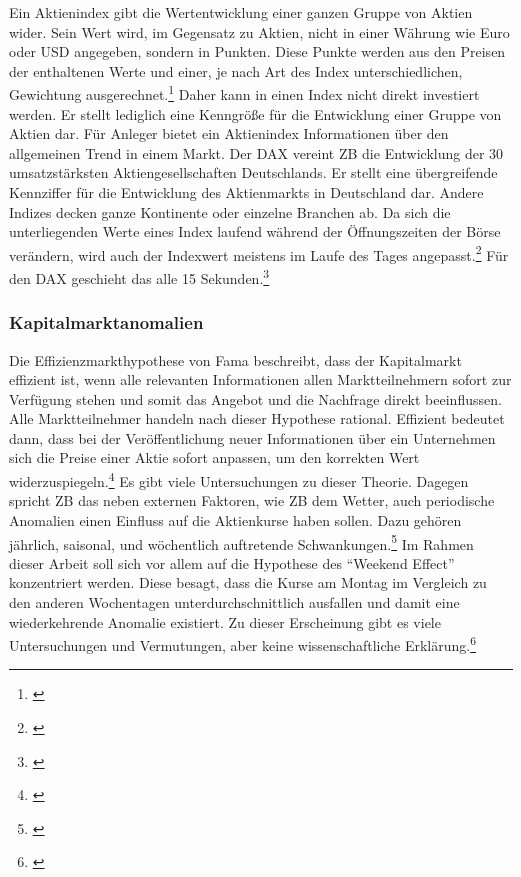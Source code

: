 Ein Aktienindex gibt die Wertentwicklung einer ganzen Gruppe von Aktien wider. Sein Wert wird, im Gegensatz zu Aktien, nicht in einer Währung wie Euro oder \gls{USD} angegeben, sondern in Punkten. Diese Punkte werden aus den Preisen der enthaltenen Werte und einer, je nach Art des Index unterschiedlichen, Gewichtung ausgerechnet.\footnote{\cite[Vgl.][61]{Daume2021}} Daher kann in einen Index nicht direkt investiert werden. Er stellt lediglich eine Kenngröße für die Entwicklung einer Gruppe von Aktien dar. Für Anleger bietet ein Aktienindex Informationen über den allgemeinen Trend in einem Markt. Der \gls{DAX} vereint \gls{ZB} die Entwicklung der 30 umsatzstärksten Aktiengesellschaften Deutschlands. Er stellt eine übergreifende Kennziffer für die Entwicklung des Aktienmarkts in Deutschland dar. Andere Indizes decken ganze Kontinente oder einzelne Branchen ab. Da sich die unterliegenden Werte eines Index laufend während der Öffnungszeiten der Börse verändern, wird auch der Indexwert meistens im Laufe des Tages angepasst.\footnote{\cite[Vgl.][110]{Grundmann2021}} Für den \gls{DAX} geschieht das alle 15 Sekunden.\footnote{\cite[Vgl.][63]{Daume2021}}

\subsubsection{Kapitalmarktanomalien}



Die Effizienzmarkthypothese von Fama beschreibt, dass der Kapitalmarkt effizient ist, wenn alle relevanten Informationen allen Marktteilnehmern sofort zur Verfügung stehen und somit das Angebot und die Nachfrage direkt beeinflussen. Alle Marktteilnehmer handeln nach dieser Hypothese rational. Effizient bedeutet dann, dass bei der Veröffentlichung neuer Informationen über ein Unternehmen sich die Preise einer Aktie sofort anpassen, um den korrekten Wert widerzuspiegeln.\footnote{\cite[Vgl.][9\psq]{Wagner2019}} Es gibt viele Untersuchungen zu dieser Theorie. Dagegen spricht \gls{ZB} das neben externen Faktoren, wie \gls{ZB} dem Wetter, auch periodische Anomalien einen Einfluss auf die Aktienkurse haben sollen. Dazu gehören jährlich, saisonal, und wöchentlich auftretende Schwankungen.\footnote{\cite[Vgl.][5\psq]{Coenen2020}} Im Rahmen dieser Arbeit soll sich vor allem auf die Hypothese des \enquote{Weekend Effect} konzentriert werden. Diese besagt, dass die Kurse am Montag im Vergleich zu den anderen Wochentagen unterdurchschnittlich ausfallen und damit eine wiederkehrende Anomalie existiert. Zu dieser Erscheinung gibt es viele Untersuchungen und Vermutungen, aber keine wissenschaftliche Erklärung.\footnote{\cite[Vgl.][8]{Coenen2020}}

